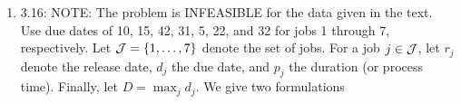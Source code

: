 \documentclass[10pt]{article}
\begin{document}
\begin{enumerate}

\item 3.16: NOTE:  The problem is INFEASIBLE for the data given in the text.  Use due dates of 10, 15, 42, 31, 5, 22, and 32 for jobs 1 through 7, respectively.  Let ${\cal J} = \{1,\ldots,7\}$ denote the set of jobs. For a job $j \in {\cal J}$, let $r_j$ denote the release date, $d_j$ the due date, and $p_j$ the duration (or process
  time).  Finally, let $D = \max_{j} d_j$. We give two formulations
  \begin{enumerate}


\end{enumerate}
\end{enumerate}
\end{document}
